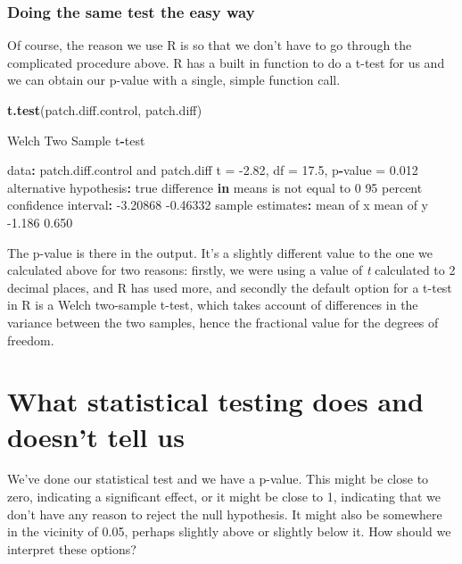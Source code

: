\documentclass[
]{book}
\newenvironment{Shaded}{\begin{snugshade}}{\end{snugshade}}
\newcommand{\ControlFlowTok}[1]{\textcolor[rgb]{0.13,0.29,0.53}{\textbf{#1}}}
\newcommand{\DecValTok}[1]{\textcolor[rgb]{0.00,0.00,0.81}{#1}}
\newcommand{\FloatTok}[1]{\textcolor[rgb]{0.00,0.00,0.81}{#1}}
\newcommand{\KeywordTok}[1]{\textcolor[rgb]{0.13,0.29,0.53}{\textbf{#1}}}
\newcommand{\NormalTok}[1]{#1}
\newcommand{\OperatorTok}[1]{\textcolor[rgb]{0.81,0.36,0.00}{\textbf{#1}}}
\newcommand{\StringTok}[1]{\textcolor[rgb]{0.31,0.60,0.02}{#1}}
\begin{document}
\hypertarget{doing-the-same-test-the-easy-way}{%
\subsubsection{Doing the same test the easy way}\label{doing-the-same-test-the-easy-way}}

Of course, the reason we use R is so that we don't have to go through the complicated procedure above. R has a built in function to do a t-test for us and we can obtain our p-value with a single, simple function call.

\begin{Shaded}
\begin{Highlighting}[]
\KeywordTok{t.test}\NormalTok{(patch.diff.control, patch.diff)}

\NormalTok{    Welch Two Sample t}\OperatorTok{-}\NormalTok{test}

\NormalTok{data}\OperatorTok{:}\StringTok{  }\NormalTok{patch.diff.control and patch.diff}
\NormalTok{t =}\StringTok{ }\FloatTok{-2.82}\NormalTok{, df =}\StringTok{ }\FloatTok{17.5}\NormalTok{, p}\OperatorTok{-}\NormalTok{value =}\StringTok{ }\FloatTok{0.012}
\NormalTok{alternative hypothesis}\OperatorTok{:}\StringTok{ }\NormalTok{true difference }\ControlFlowTok{in}\NormalTok{ means is not equal to }\DecValTok{0}
\DecValTok{95}\NormalTok{ percent confidence interval}\OperatorTok{:}
\StringTok{ }\FloatTok{-3.20868} \FloatTok{-0.46332}
\NormalTok{sample estimates}\OperatorTok{:}
\NormalTok{mean of x mean of y }
   \FloatTok{-1.186}     \FloatTok{0.650} 
\end{Highlighting}
\end{Shaded}

The p-value is there in the output. It's a slightly different value to the one we calculated above for two reasons: firstly, we were using a value of \emph{t} calculated to 2 decimal places, and R has used more, and secondly the default option for a t-test in R is a Welch two-sample t-test, which takes account of differences in the variance between the two samples, hence the fractional value for the degrees of freedom.

\hypertarget{what-statistical-testing-does-and-doesnt-tell-us}{%
\section{What statistical testing does and doesn't tell us}\label{what-statistical-testing-does-and-doesnt-tell-us}}

We've done our statistical test and we have a p-value. This might be close to zero, indicating a significant effect, or it might be close to 1, indicating that we don't have any reason to reject the null hypothesis. It might also be somewhere in the vicinity of 0.05, perhaps slightly above or slightly below it. How should we interpret these options?
\end{document}
